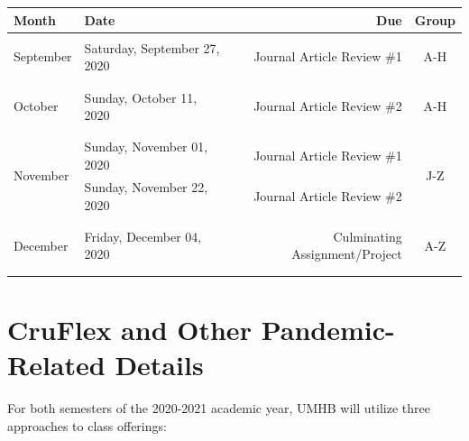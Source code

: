 \documentclass[
]{article}
\begin{document}
\begin{tabularx}{\linewidth}{p{3cm}Xrc}
\hline
\textbf{Month} & \textbf{Date} & \textbf{Due} & \textbf{Group} \\
\hline
&  &  & \\
\multirow{1}{*}{September} & Saturday, September 27, 2020 & Journal Article Review \#1 & A-H \\
&  &  & \\
\arrayrulecolor{gray}\hline

&  &  & \\
\multirow{1}{*}{October} & Sunday, October 11, 2020 & Journal Article Review \#2 & A-H \\
&  &  & \\
\arrayrulecolor{gray}\hline

&  &  & \\
\multirow{2}{*}{November} & Sunday, November 01, 2020 & Journal Article Review \#1 & \multirow{2}{*}{J-Z} \\
& Sunday, November 22, 2020 & Journal Article Review \#2 \\
&  &  & \\
\arrayrulecolor{gray}\hline


&  &  & \\
\multirow{1}{*}{December} & Friday, December 04, 2020 & Culminating Assignment/Project & A-Z\\
&  &  & \\
\arrayrulecolor{gray}\hline

\end{tabularx}

\newpage
\section{CruFlex and Other Pandemic-Related Details}

For both semesters of the 2020-2021 academic year, UMHB will utilize
three approaches to class offerings:
\end{document}
